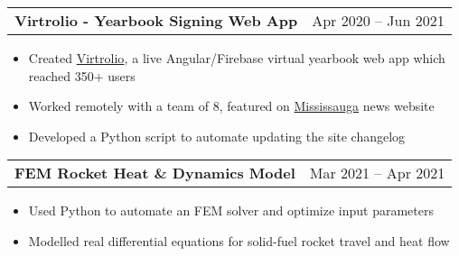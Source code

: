 \documentclass[a4paper,10pt]{article}
\begin{document}
\begin{tabularx}{\linewidth}{@{}X r@{}}
\begin{minipage}[t]{\linewidth}
  \textbf{Virtrolio - Yearbook Signing Web App}
\end{minipage}
&     Apr 2020 -- Jun 2021
\end{tabularx}
\begin{itemize}[nosep,after=\strut, leftmargin=1em, itemsep=3pt,label=--]
  \item Created \href{https://virtrolio.web.app/}{Virtrolio}\textit{, }a live Angular/Firebase virtual yearbook web app which reached 350+ users
\item Worked remotely with a team of 8, featured on \href{https://www.mississauga.com/community-story/10071561--something-to-cherish-former-mississauga-students-launch-online-yearbook/}{Mississauga} news website
\item Developed a Python script to automate updating the site changelog
\end{itemize}
\begin{tabularx}{\linewidth}{@{}X r@{}}
\begin{minipage}[t]{\linewidth}
  \textbf{FEM Rocket Heat \& Dynamics Model}
\end{minipage}
&     Mar 2021 -- Apr 2021
\end{tabularx}
\begin{itemize}[nosep,after=\strut, leftmargin=1em, itemsep=3pt,label=--]
  \item Used Python to automate an FEM solver and optimize input parameters
\item Modelled real differential equations for solid-fuel rocket travel and heat flow
\end{itemize}
\end{document}
